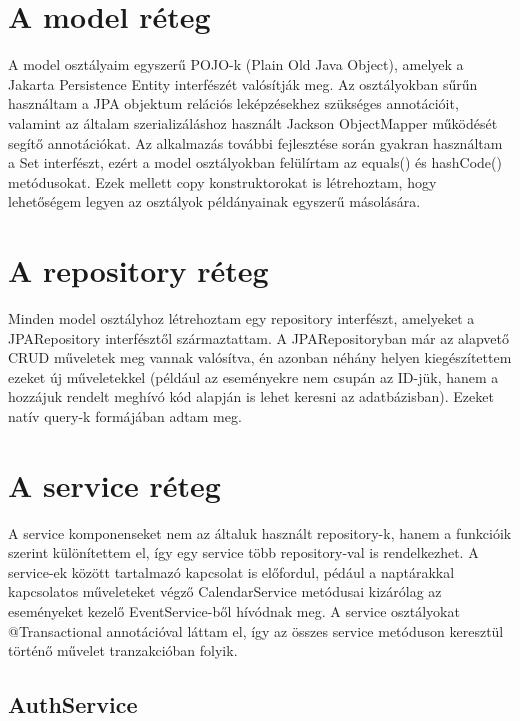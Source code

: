 \documentclass[a4paper,12pt]{report}
\theoremstyle{definition}
\theoremstyle{remark}
\begin{document}
\section{A model réteg}

A model osztályaim egyszerű POJO-k (Plain Old Java Object), amelyek a Jakarta Persistence Entity interfészét valósítják meg. Az osztályokban sűrűn használtam a JPA objektum relációs leképzésekhez szükséges annotációit, valamint az általam szerializáláshoz használt Jackson ObjectMapper működését segítő annotációkat. Az alkalmazás további fejlesztése során gyakran használtam a Set interfészt, ezért a model osztályokban felülírtam az equals() és hashCode() metódusokat. Ezek mellett copy konstruktorokat is létrehoztam, hogy lehetőségem legyen az osztályok példányainak egyszerű másolására.

\section{A repository réteg}

Minden model osztályhoz létrehoztam egy repository interfészt, amelyeket a JPARepository interfésztől származtattam. A JPARepositoryban már az alapvető CRUD műveletek meg vannak valósítva, én azonban néhány helyen kiegészítettem ezeket új műveletekkel (például az eseményekre nem csupán az ID-jük, hanem a hozzájuk rendelt meghívó kód alapján is lehet keresni az adatbázisban). Ezeket natív query-k formájában adtam meg.

\section{A service réteg}

A service komponenseket nem az általuk használt repository-k, hanem a funkcióik szerint különítettem el, így egy service több repository-val is rendelkezhet. A service-ek között tartalmazó kapcsolat is előfordul, pédául a naptárakkal kapcsolatos műveleteket végző CalendarService metódusai kizárólag az eseményeket kezelő EventService-ből hívódnak meg. A service osztályokat @Transactional annotációval láttam el, így az összes service metóduson keresztül történő művelet tranzakcióban folyik.

\subsection{AuthService}
\end{document}
